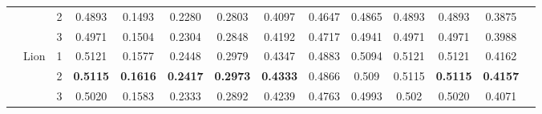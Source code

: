 \documentclass[conference]{IEEEtran}
\begin{document}
\begin{table}[t]
{\begin{tabular}{lllccccccccccc}
 & & 2 & 0.4893 & 0.1493 & 0.2280 & 0.2803 & 0.4097 & 0.4647 & 0.4865 & 0.4893 & 0.4893 & 0.3875 \\
 & & 3 & 0.4971 & 0.1504 & 0.2304 & 0.2848 & 0.4192 & 0.4717 & 0.4941 & 0.4971 & 0.4971 & 0.3988 \\
\cmidrule{2-13}
 & \multirow{3}{*}{Lion} 
 & 1 & 0.5121 & 0.1577 & 0.2448 & 0.2979 & 0.4347 & 0.4883 & 0.5094 & 0.5121 & 0.5121 & 0.4162 \\
 & & 2 & \textbf{0.5115} & \textbf{0.1616} & \textbf{0.2417} & \textbf{0.2973} & \textbf{0.4333} & 0.4866 & 0.509 & 0.5115 & \textbf{0.5115} & \textbf{0.4157} \\
 & & 3 & 0.5020 & 0.1583 & 0.2333 & 0.2892 & 0.4239 & 0.4763 & 0.4993 & 0.502 & 0.5020 & 0.4071 \\
\bottomrule
\end{tabular}
}
\end{table}
\end{document}
